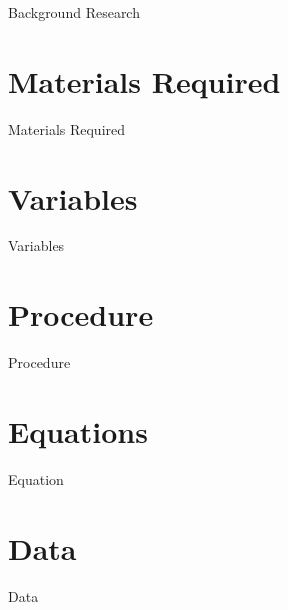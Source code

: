 \documentclass[12pt, a4paper]{article}
\begin{document}
        {Background Research}
        
\section{{Materials Required}}
        
        {Materials Required}
        
\section{{Variables}}
        
        {Variables}
        
\section{{Procedure}}
        
        {Procedure}

        
        
        
\section{{Equations}}
        
        {Equation}

\section{{Data}}

	  {Data}      
        
        
        
        
\end{document}
